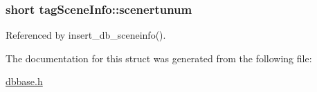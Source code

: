 \hypertarget{structtagSceneInfo_ab581a1c2ce38dbba5cbf0fa34364d67b}{
\subsubsection[{scenertunum}]{\setlength{\rightskip}{0pt plus 5cm}short tag\-Scene\-Info\-::scenertunum}}\label{structtagSceneInfo_ab581a1c2ce38dbba5cbf0fa34364d67b}


Referenced by insert\-\_\-db\-\_\-sceneinfo().



The documentation for this struct was generated from the following file\-:\begin{DoxyCompactItemize}
\item 
\hyperlink{dbbase_8h}{dbbase.\-h}\end{DoxyCompactItemize}
